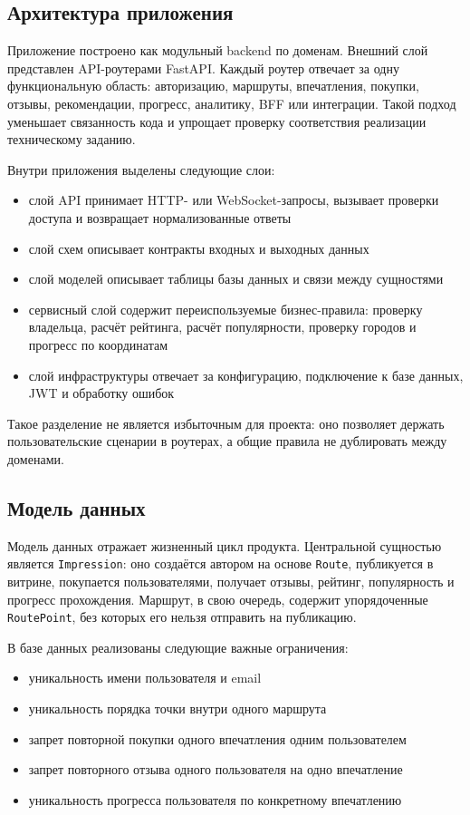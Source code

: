 \documentclass[a4paper,12pt]{extarticle}
\begin{document}
\subsection{Архитектура приложения}

Приложение построено как модульный backend по доменам. Внешний слой представлен API-роутерами FastAPI. Каждый роутер отвечает за одну функциональную область: авторизацию, маршруты, впечатления, покупки, отзывы, рекомендации, прогресс, аналитику, BFF или интеграции. Такой подход уменьшает связанность кода и упрощает проверку соответствия реализации техническому заданию.

Внутри приложения выделены следующие слои:
\begin{itemize}
	\item слой API принимает HTTP- или WebSocket-запросы, вызывает проверки доступа и возвращает нормализованные ответы
	\item слой схем описывает контракты входных и выходных данных
	\item слой моделей описывает таблицы базы данных и связи между сущностями
	\item сервисный слой содержит переиспользуемые бизнес-правила: проверку владельца, расчёт рейтинга, расчёт популярности, проверку городов и прогресс по координатам
	\item слой инфраструктуры отвечает за конфигурацию, подключение к базе данных, JWT и обработку ошибок
\end{itemize}

Такое разделение не является избыточным для проекта: оно позволяет держать пользовательские сценарии в роутерах, а общие правила не дублировать между доменами.

\subsection{Модель данных}

Модель данных отражает жизненный цикл продукта. Центральной сущностью является \texttt{Impression}: оно создаётся автором на основе \texttt{Route}, публикуется в витрине, покупается пользователями, получает отзывы, рейтинг, популярность и прогресс прохождения. Маршрут, в свою очередь, содержит упорядоченные \texttt{RoutePoint}, без которых его нельзя отправить на публикацию.

В базе данных реализованы следующие важные ограничения:
\begin{itemize}
	\item уникальность имени пользователя и email
	\item уникальность порядка точки внутри одного маршрута
	\item запрет повторной покупки одного впечатления одним пользователем
	\item запрет повторного отзыва одного пользователя на одно впечатление
	\item уникальность прогресса пользователя по конкретному впечатлению
\end{itemize}
\end{document}
